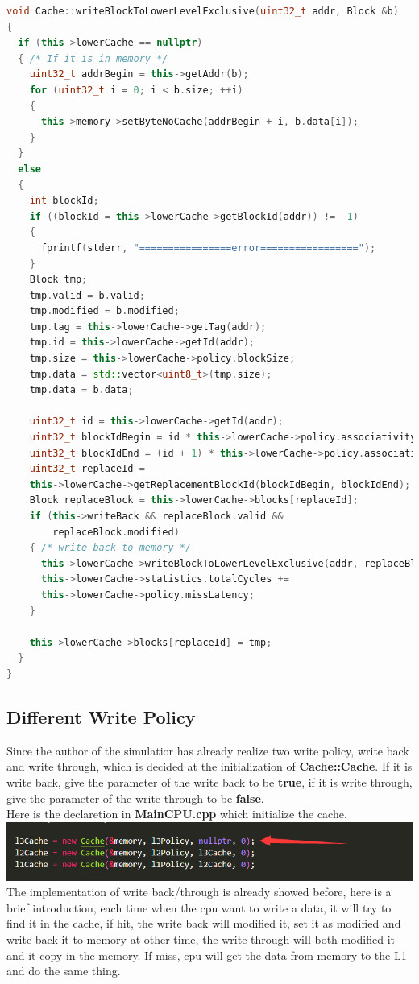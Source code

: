 \documentclass{article}
\begin{document}
\begin{lstlisting}[language=c++]
void Cache::writeBlockToLowerLevelExclusive(uint32_t addr, Block &b)
{
  if (this->lowerCache == nullptr)
  { /* If it is in memory */
    uint32_t addrBegin = this->getAddr(b);
    for (uint32_t i = 0; i < b.size; ++i)
    {
      this->memory->setByteNoCache(addrBegin + i, b.data[i]);
    }
  }
  else
  {
    int blockId;
    if ((blockId = this->lowerCache->getBlockId(addr)) != -1)
    {
      fprintf(stderr, "================error=================");
    }
    Block tmp;
    tmp.valid = b.valid;
    tmp.modified = b.modified;
    tmp.tag = this->lowerCache->getTag(addr);
    tmp.id = this->lowerCache->getId(addr);
    tmp.size = this->lowerCache->policy.blockSize;
    tmp.data = std::vector<uint8_t>(tmp.size);
    tmp.data = b.data;

    uint32_t id = this->lowerCache->getId(addr);
    uint32_t blockIdBegin = id * this->lowerCache->policy.associativity;
    uint32_t blockIdEnd = (id + 1) * this->lowerCache->policy.associativity;
    uint32_t replaceId = 
    this->lowerCache->getReplacementBlockId(blockIdBegin, blockIdEnd);
    Block replaceBlock = this->lowerCache->blocks[replaceId];
    if (this->writeBack && replaceBlock.valid &&
        replaceBlock.modified)
    { /* write back to memory */
      this->lowerCache->writeBlockToLowerLevelExclusive(addr, replaceBlock);
      this->lowerCache->statistics.totalCycles += 
      this->lowerCache->policy.missLatency;
    }

    this->lowerCache->blocks[replaceId] = tmp;
  }
}
\end{lstlisting}
\subsection{Different Write Policy}
Since the author of the simulatior has already realize two write policy, write back and write through, which is decided at the initialization of \textbf{Cache::Cache}. If it is write back, give the parameter of the write back to be \textbf{true}, if it is write through, give the parameter of the write through to be \textbf{false}.\\
Here is the declaretion in \textbf{MainCPU.cpp} which initialize the cache.\\
\includegraphics[scale = 0.5]{Write Policy.png}\\
The implementation of write back/through is already showed before, here is a brief introduction, each time when the cpu want to write a data, it will try to find it in the cache, if hit, the write back will modified it, set it as modified and write back it to memory at other time, the write through will both modified it and it copy in the memory. If miss, cpu will get the data from memory to the L1 and do the same thing.
\end{document}
